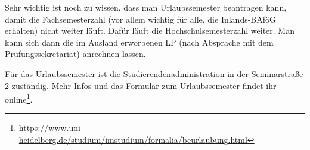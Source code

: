 Sehr wichtig ist noch zu wissen, dass man Urlaubssemester beantragen kann, damit die Fachsemesterzahl (vor allem wichtig für alle, die Inlands-BAföG erhalten) nicht weiter läuft. Dafür läuft die Hochschulsemesterzahl weiter. Man kann sich dann die im Ausland erworbenen \gls{LP} (nach Absprache mit dem Prüfungssekretariat) anrechnen lassen.

Für das Urlaubssemester ist die Studierendenadministration in der Seminarstraße 2 zuständig. Mehr Infos und das Formular zum Urlaubssemester findet ihr online\footnote{\url{https://www.uni-heidelberg.de/studium/imstudium/formalia/beurlaubung.html}}.

